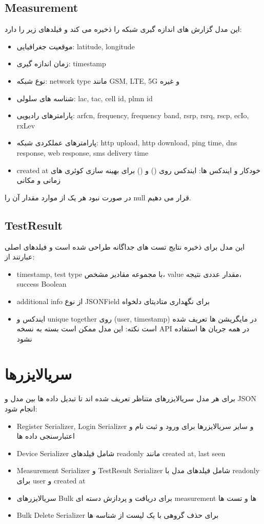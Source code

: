 \subsection{Measurement}
این مدل گزارش های اندازه گیری شبکه را ذخیره می کند و فیلدهای زیر را دارد:
\begin{itemize}
  \item موقعیت جغرافیایی: latitude, longitude
  \item زمان اندازه گیری: timestamp
  \item نوع شبکه: network type مانند GSM, LTE, 5G و غیره
  \item شناسه های سلولی: lac, tac, cell id, plmn id
  \item پارامترهای رادیویی: arfcn, frequency, frequency band, rsrp, rsrq, rscp, ecIo, rxLev
  \item پارامترهای عملکردی شبکه: http upload, http download, ping time, dns response, web response, sms delivery time
  \item created at خودکار و ایندکس ها: ایندکس روی () و () برای بهینه سازی کوئری های زمانی و مکانی
\end{itemize}
در صورت نبود هر یک از موارد مقدار آن را null قرار می دهیم.

\subsection{TestResult}
این مدل برای ذخیره نتایج تست های جداگانه طراحی شده است و فیلدهای اصلی عبارتند از:
\begin{itemize}
  \item timestamp, test type با مجموعه مقادیر مشخص، value مقدار عددی نتیجه، success Boolean
  \item additional info از نوع JSONField برای نگهداری متادیتای دلخواه
  \item ایندکس و unique together روی (user, timestamp) در مایگریشن ها تعریف شده است
  نکته: این مدل ممکن است بسته به نسخه API در همه جریان ها استفاده نشود
\end{itemize}

\section{سریالایزرها}
برای هر مدل سریالایزرهای متناظر تعریف شده اند تا تبدیل داده ها بین مدل و JSON انجام شود:
\begin{itemize}
  \item Register Serializer, Login Serializer و سایر سریالایزرها برای ورود و ثبت نام و اعتبارسنجی داده ها
  \item Device Serializer شامل فیلدهای readonly مانند created at, last seen
  \item Measurement Serializer و TestResult Serializer شامل فیلدهای مدل با readonly برای user و created at
  \item سریالایزرهای Bulk برای دریافت و پردازش دسته ای measurement ها و تست ها
  \item Bulk Delete Serializer برای حذف گروهی با یک لیست از شناسه ها
\end{itemize}

